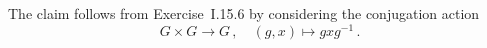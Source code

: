 \subsection{}

The claim follows from Exercise~I.15.6 by considering the conjugation action
\[
	G × G \to G \,,
	\quad
	(g, x) \mapsto g x g^{-1} \,.
\]
